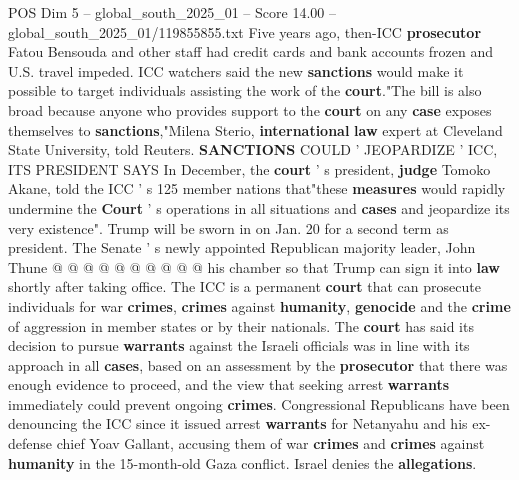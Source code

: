 \begin{textsample}{POS Dim 5 – global\_south\_2025\_01 – Score 14.00 – global\_south\_2025\_01/119855855.txt}
Five years ago, then-ICC \textbf{prosecutor} Fatou Bensouda and other staff had credit cards and bank accounts frozen and U.S. travel impeded.
ICC watchers said the new \textbf{sanctions} would make it possible to target individuals assisting the work of the \textbf{court}."The bill is also broad because anyone who provides support to the \textbf{court} on any \textbf{case} exposes themselves to \textbf{sanctions},"Milena Sterio, \textbf{international} \textbf{law} expert at Cleveland State University, told Reuters. \textbf{SANCTIONS} COULD ' JEOPARDIZE ' ICC, ITS PRESIDENT SAYS In December, the \textbf{court} ' s president, \textbf{judge} Tomoko Akane, told the ICC ' s 125 member nations that"these \textbf{measures} would rapidly undermine the \textbf{Court} ' s operations in all situations and \textbf{cases} and jeopardize its very existence".
Trump will be sworn in on Jan. 20 for a second term as president.
The Senate ' s newly appointed Republican majority leader, John Thune @ @ @ @ @ @ @ @ @ @ his chamber so that Trump can sign it into \textbf{law} shortly after taking office.
The ICC is a permanent \textbf{court} that can prosecute individuals for war \textbf{crimes}, \textbf{crimes} against \textbf{humanity}, \textbf{genocide} and the \textbf{crime} of aggression in member states or by their nationals.
The \textbf{court} has said its decision to pursue \textbf{warrants} against the Israeli officials was in line with its approach in all \textbf{cases}, based on an assessment by the \textbf{prosecutor} that there was enough evidence to proceed, and the view that seeking arrest \textbf{warrants} immediately could prevent ongoing \textbf{crimes}.
Congressional Republicans have been denouncing the ICC since it issued arrest \textbf{warrants} for Netanyahu and his ex-defense chief Yoav Gallant, accusing them of war \textbf{crimes} and \textbf{crimes} against \textbf{humanity} in the 15-month-old Gaza conflict.
Israel denies the \textbf{allegations}.

\end{textsample}
